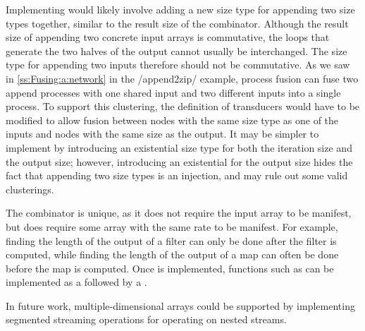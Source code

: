 Implementing \Hs@append@ would likely involve adding a new size type for appending two size types together, similar to the result size of the \Hs@cross@ combinator.
Although the result size of appending two concrete input arrays is commutative, the loops that generate the two halves of the output cannot usually be interchanged.
The size type for appending two inputs therefore should not be commutative.
As we saw in \cref{ss:Fusing:a:network} in the \Hs/append2zip/ example, process fusion can fuse two append processes with one shared input and two different inputs into a single process.
To support this clustering, the definition of transducers would have to be modified to allow fusion between nodes with the same size type as one of the inputs and nodes with the same size as the output.
It may be simpler to implement \Hs@append@ by introducing an existential size type for both the iteration size and the output size; however, introducing an existential for the output size hides the fact that appending two size types is an injection, and may rule out some valid clusterings.

The \Hs@length@ combinator is unique, as it does not require the input array to be manifest, but does require some array with the same rate to be manifest.
For example, finding the length of the output of a filter can only be done after the filter is computed, while finding the length of the output of a map can often be done before the map is computed.
Once \Hs@length@ is implemented, functions such as \Hs@reverse@ can be implemented as a \Hs@generate@ followed by a \Hs@gather@.

In future work, multiple-dimensional arrays could be supported by implementing segmented streaming operations for operating on nested streams.

% 
 
